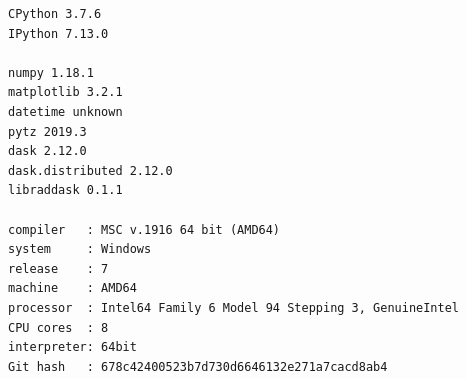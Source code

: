 \begin{lstlisting}[style=outcellstyle]
CPython 3.7.6
IPython 7.13.0

numpy 1.18.1
matplotlib 3.2.1
datetime unknown
pytz 2019.3
dask 2.12.0
dask.distributed 2.12.0
libraddask 0.1.1

compiler   : MSC v.1916 64 bit (AMD64)
system     : Windows
release    : 7
machine    : AMD64
processor  : Intel64 Family 6 Model 94 Stepping 3, GenuineIntel
CPU cores  : 8
interpreter: 64bit
Git hash   : 678c42400523b7d730d6646132e271a7cacd8ab4

\end{lstlisting}


